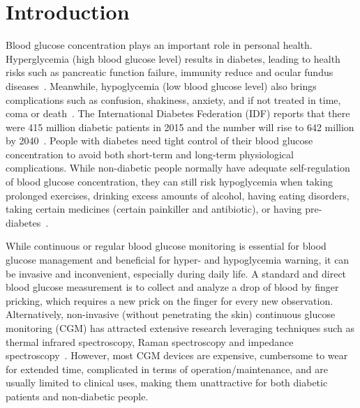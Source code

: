 
\section{Introduction}
\label{sec:intro}
Blood glucose concentration plays an important role in personal health.
Hyperglycemia (high blood glucose level) results in diabetes, leading to health risks such as pancreatic function failure, immunity reduce and ocular fundus diseases~\cite{bib:DC95:Klein}.
Meanwhile, hypoglycemia (low blood glucose level) also brings complications such as confusion, shakiness, anxiety, and if not treated in time, coma or death~\cite{bib:AJM91:DCCT}.
The International Diabetes Federation (IDF) reports that there were 415 million diabetic patients in 2015 and the number will rise to 642 million by 2040~\cite{bib:IDF15}.
People with diabetes need tight control of their blood glucose concentration to avoid both short-term and long-term physiological complications.
While non-diabetic people normally have adequate self-regulation of blood glucose concentration, they can still risk hypoglycemia when taking prolonged exercises, drinking excess amounts of alcohol, having eating disorders, taking certain medicines (\eg certain painkiller and antibiotic), or having pre-diabetes~\cite{bib:JCEM13:Eckert, bib:NEJM82:Felig}.

While continuous or regular blood glucose monitoring is essential for blood glucose management and beneficial for hyper- and hypoglycemia warning, it can be invasive and inconvenient, especially during daily life.
A standard and direct blood glucose measurement is to collect and analyze a drop of blood by finger pricking, which requires a new prick on the finger for every new observation.
Alternatively, non-invasive (without penetrating the skin) continuous glucose monitoring (CGM) has attracted extensive research leveraging techniques such as thermal infrared spectroscopy, Raman spectroscopy and impedance spectroscopy~\cite{bib:MEP08:Do, bib:JDST10:Vaddiraju}.
However, most CGM devices are expensive, cumbersome to wear for extended time, complicated in terms of operation/maintenance, and are usually limited to clinical uses, making them unattractive for both diabetic patients and non-diabetic people.

